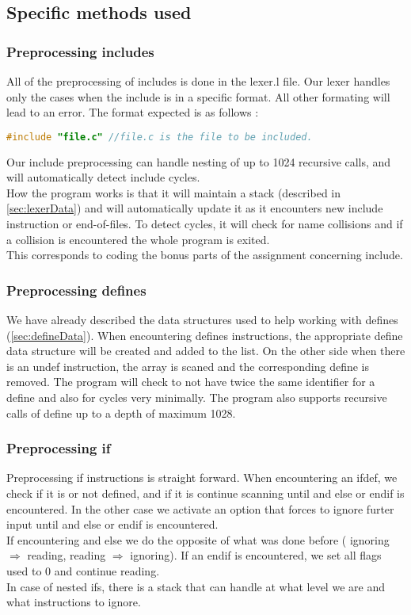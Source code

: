 \documentclass{article}
\begin{document}
\subsection{Specific methods used}
\subsubsection{Preprocessing includes}
All of the preprocessing of includes is done in the lexer.l file. Our lexer handles only the cases when the include is in a specific format. All other formating will lead to an error. 
The format expected is as follows : 
\begin{lstlisting}[language=C]
 #include "file.c" //file.c is the file to be included. 
\end{lstlisting}
Our include preprocessing can handle nesting of up to 1024 recursive calls, and will automatically detect include cycles. \\
How the program works is that it will maintain a stack (described in \autoref{sec:lexerData}) and will automatically update it as it encounters new include instruction or end-of-files. To detect cycles, it will check for name collisions and if a collision is encountered the whole program is exited. \\
This corresponds to coding the bonus parts of the assignment concerning include. 
\subsubsection{Preprocessing defines}
We have already described the data structures used to help working with defines (\autoref{sec:defineData}). 
When encountering defines instructions, the appropriate define data structure will be created and added to the list. On the other side when there is an undef instruction, the array is scaned and the corresponding define is removed. 
The program will check to not have twice the same identifier for a define and also for cycles very minimally. The program also supports recursive calls of define up to a depth of maximum 1028. 
\subsubsection{Preprocessing if}
Preprocessing if instructions is straight forward. When encountering an ifdef, we check if it is or not defined, and if it is continue scanning until and else or endif is encountered. In the other case we activate an option that forces to ignore furter input until and else or endif is encountered. \\
If encountering and else we do the opposite of what was done before ( ignoring $\Rightarrow$ reading, reading $\Rightarrow$ ignoring). If an endif is encountered, we set all flags used to 0 and continue reading. \\
In case of nested ifs, there is a stack that can handle at what level we are and what instructions to ignore. 
\end{document}
